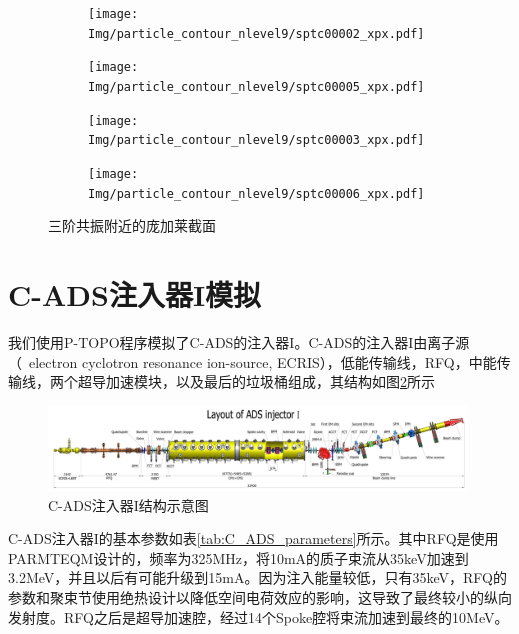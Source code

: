 \begin{figure}[!htb]
    \centering
    \begin{subfigure}[b]{0.48\textwidth}
        \texttt{[image: Img/particle\_contour\_nlevel9/sptc00002\_xpx.pdf]}
        \caption{}
    \end{subfigure}
    \begin{subfigure}[b]{0.48\textwidth}
        \texttt{[image: Img/particle\_contour\_nlevel9/sptc00005\_xpx.pdf]}
        \caption{}
    \end{subfigure}
    \begin{subfigure}[b]{0.48\textwidth}
        \texttt{[image: Img/particle\_contour\_nlevel9/sptc00003\_xpx.pdf]}
        \caption{}
    \end{subfigure}
    \begin{subfigure}[b]{0.48\textwidth}
        \texttt{[image: Img/particle\_contour\_nlevel9/sptc00006\_xpx.pdf]}
        \caption{}
    \end{subfigure}
    \caption{三阶共振附近的庞加莱截面}\label{fig:Poincare}
\end{figure}
\section{C-ADS注入器I模拟}        \label{section:ADS_simulation}
我们使用P-TOPO程序模拟了C-ADS的注入器I。C-ADS的注入器I由离子源（~electron cyclotron resonance ion-source, ECRIS），低能传输线，RFQ，中能传输线，两个超导加速模块，以及最后的垃圾桶组成，其结构如图\ref{fig:ADS_layout}所示

\begin{figure}[!htb]
    \centering
    \includegraphics[width=0.99\textwidth]{Img/Layout_of_ADS_Injector_I.jpg}
    \caption{C-ADS注入器I结构示意图}
    \label{fig:ADS_layout}
\end{figure}

C-ADS注入器I的基本参数如表\ref{tab:C_ADS_parameters}所示。其中RFQ是使用PARMTEQM\cite{crandall1998rfq}设计的，频率为325MHz，将10mA的质子束流从35keV加速到3.2MeV，并且以后有可能升级到15mA。因为注入能量较低，只有35keV，RFQ的参数和聚束节使用绝热设计以降低空间电荷效应的影响，这导致了最终较小的纵向发射度。RFQ之后是超导加速腔，经过14个Spoke腔将束流加速到最终的10MeV。


